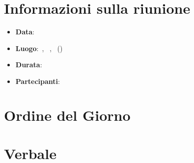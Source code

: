 \section{Informazioni sulla riunione}
\begin{itemize}
	\item \textbf{Data}: \data
	\item \textbf{Luogo}:\ \luogo, \via\ \civico, \citta\ (\provincia)
	\item \textbf{Durata}: \durata
	\item \textbf{Partecipanti}: \partecipanti
\end{itemize}
\section{Ordine del Giorno}
\ordineDelGiorno

\section{Verbale}
\contenuto